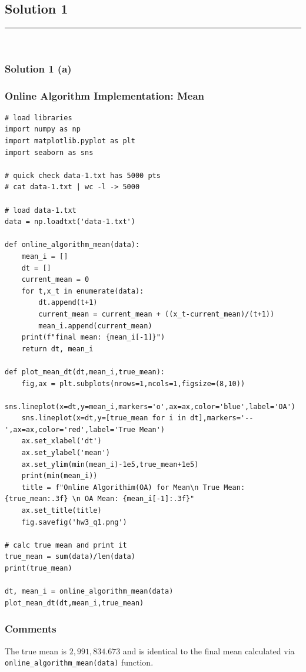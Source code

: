 \documentclass{article}
\begin{document}
\pagestyle{fancy}

\subsection*{Solution 1}
\noindent\rule{\textwidth}{0.4pt}\\

\subsubsection*{Solution 1 (a)}
\subsubsection*{Online Algorithm Implementation: Mean}

\begin{lstlisting}
# load libraries
import numpy as np
import matplotlib.pyplot as plt
import seaborn as sns

# quick check data-1.txt has 5000 pts
# cat data-1.txt | wc -l -> 5000

# load data-1.txt
data = np.loadtxt('data-1.txt')

def online_algorithm_mean(data):
    mean_i = []
    dt = []
    current_mean = 0
    for t,x_t in enumerate(data):
        dt.append(t+1)
        current_mean = current_mean + ((x_t-current_mean)/(t+1))
        mean_i.append(current_mean)
    print(f"final mean: {mean_i[-1]}")
    return dt, mean_i

def plot_mean_dt(dt,mean_i,true_mean):
    fig,ax = plt.subplots(nrows=1,ncols=1,figsize=(8,10))
    sns.lineplot(x=dt,y=mean_i,markers='o',ax=ax,color='blue',label='OA')
    sns.lineplot(x=dt,y=[true_mean for i in dt],markers='--',ax=ax,color='red',label='True Mean')
    ax.set_xlabel('dt')
    ax.set_ylabel('mean')
    ax.set_ylim(min(mean_i)-1e5,true_mean+1e5)
    print(min(mean_i))
    title = f"Online Algorithim(OA) for Mean\n True Mean: {true_mean:.3f} \n OA Mean: {mean_i[-1]:.3f}"
    ax.set_title(title)
    fig.savefig('hw3_q1.png')

# calc true mean and print it
true_mean = sum(data)/len(data)
print(true_mean)

dt, mean_i = online_algorithm_mean(data)
plot_mean_dt(dt,mean_i,true_mean)
\end{lstlisting}


\subsubsection*{Comments}
\parbox{\textwidth}{
The true mean is $2,991,834.673$ and is identical to the final mean calculated via \texttt{online\_algorithm\_mean(data)} function.
}
\end{document}
